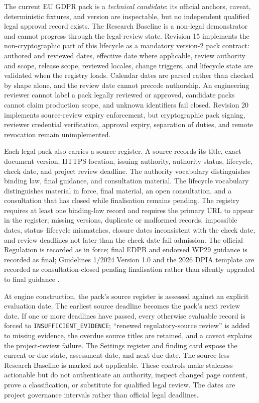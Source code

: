 The current EU GDPR pack is a \emph{technical candidate}: its official anchors, caveat, deterministic fixtures, and version are inspectable, but no independent qualified legal approval record exists. The Research Baseline is a non-legal demonstrator and cannot progress through the legal-review state. Revision 15 implements the non-cryptographic part of this lifecycle as a mandatory version-2 pack contract: authored and reviewed dates, effective date where applicable, review authority and scope, release scope, reviewed locales, change triggers, and lifecycle state are validated when the registry loads. Calendar dates are parsed rather than checked by shape alone, and the review date cannot precede authorship. An engineering reviewer cannot label a pack legally reviewed or approved, candidate packs cannot claim production scope, and unknown identifiers fail closed. Revision 20 implements source-review expiry enforcement, but cryptographic pack signing, reviewer credential verification, approval expiry, separation of duties, and remote revocation remain unimplemented.

Each legal pack also carries a source register. A source records its title, exact document version, HTTPS location, issuing authority, authority status, lifecycle, check date, and project review deadline. The authority vocabulary distinguishes binding law, final guidance, and consultation material. The lifecycle vocabulary distinguishes material in force, final material, an open consultation, and a consultation that has closed while finalisation remains pending. The registry requires at least one binding-law record and requires the primary URL to appear in the register; missing versions, duplicate or malformed records, impossible dates, status--lifecycle mismatches, closure dates inconsistent with the check date, and review deadlines not later than the check date fail admission. The official Regulation is recorded as in force; final EDPB and endorsed WP29 guidance is recorded as final; Guidelines 1/2024 Version 1.0 and the 2026 DPIA template are recorded as consultation-closed pending finalisation rather than silently upgraded to final guidance \cite{eurlex2016,edpblia2024draft,edpbdpia2026consultation}.

At engine construction, the pack's source register is assessed against an explicit evaluation date. The earliest source deadline becomes the pack's next review date. If one or more deadlines have passed, every otherwise evaluable record is forced to \texttt{INSUFFICIENT\_EVIDENCE}; ``renewed regulatory-source review'' is added to missing evidence, the overdue source titles are retained, and a caveat explains the project-review failure. The Settings register and finding card expose the current or due state, assessment date, and next due date. The source-less Research Baseline is marked not applicable. These controls make staleness actionable but do not authenticate an authority, inspect changed page content, prove a classification, or substitute for qualified legal review. The dates are project governance intervals rather than official legal deadlines.

